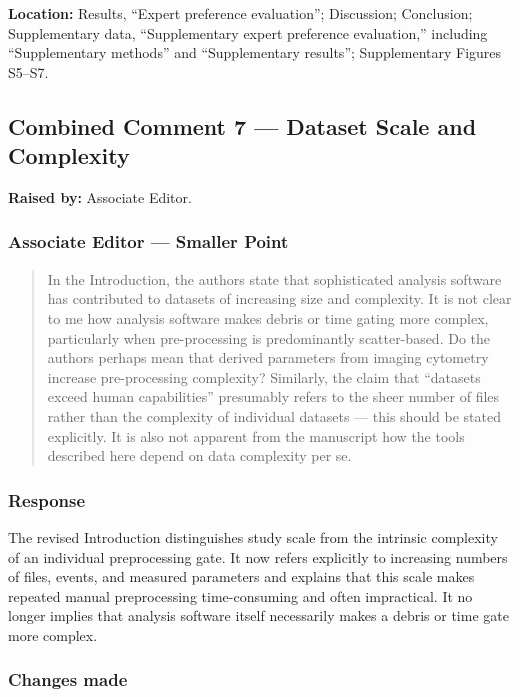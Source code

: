 \documentclass[
  11pt,
  a4paper,
]{article}
\begin{document}
\textbf{Location:} Results, ``Expert preference evaluation'';
Discussion; Conclusion; Supplementary data, ``Supplementary expert
preference evaluation,'' including ``Supplementary methods'' and
``Supplementary results''; Supplementary Figures S5--S7.

\subsection{Combined Comment 7 --- Dataset Scale and
Complexity}\label{combined-comment-7--dataset-scale-and-complexity}

\textbf{Raised by:} Associate Editor.

\subsubsection{Associate Editor --- Smaller
Point}\label{associate-editor--smaller-point}

\begin{quote}
In the Introduction, the authors state that sophisticated analysis
software has contributed to datasets of increasing size and complexity.
It is not clear to me how analysis software makes debris or time gating
more complex, particularly when pre-processing is predominantly
scatter-based. Do the authors perhaps mean that derived parameters from
imaging cytometry increase pre-processing complexity? Similarly, the
claim that ``datasets exceed human capabilities'' presumably refers to
the sheer number of files rather than the complexity of individual
datasets --- this should be stated explicitly. It is also not apparent
from the manuscript how the tools described here depend on data
complexity per se.
\end{quote}

\subsubsection{Response}\label{response-6}

The revised Introduction distinguishes study scale from the intrinsic
complexity of an individual preprocessing gate. It now refers explicitly
to increasing numbers of files, events, and measured parameters and
explains that this scale makes repeated manual preprocessing
time-consuming and often impractical. It no longer implies that analysis
software itself necessarily makes a debris or time gate more complex.

\subsubsection{Changes made}\label{changes-made-6}
\end{document}
